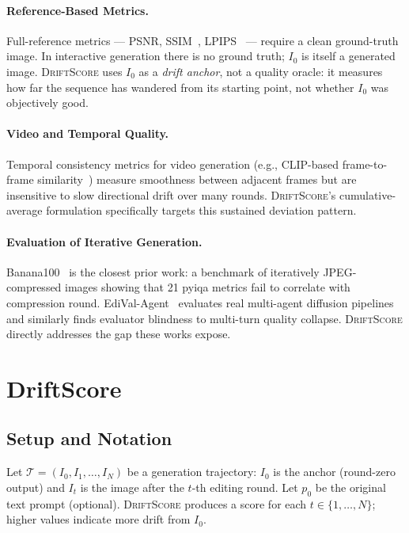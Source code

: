 \documentclass[sigconf]{acmart}
\newcommand{\DS}{\textsc{DriftScore}}
\newcommand{\Izero}{\ensuremath{I_0}}
\newcommand{\pzero}{\ensuremath{p_0}}
\begin{document}
\paragraph{Reference-Based Metrics.}
Full-reference metrics --- PSNR, SSIM~\cite{wang2004ssim},
LPIPS~\cite{zhang2018lpips} --- require a clean ground-truth image.
In interactive generation there is no ground truth; $\Izero$ is itself
a generated image.
\DS{} uses $\Izero$ as a \emph{drift anchor}, not a quality oracle: it
measures how far the sequence has wandered from its starting point, not
whether $\Izero$ was objectively good.

\paragraph{Video and Temporal Quality.}
Temporal consistency metrics for video generation
(e.g., CLIP-based frame-to-frame similarity~\cite{wu2023tuneavideo})
measure smoothness between adjacent frames but are insensitive to slow
directional drift over many rounds.
\DS{}'s cumulative-average formulation specifically targets this
sustained deviation pattern.

\paragraph{Evaluation of Iterative Generation.}
Banana100~\cite{banana100_2026} is the closest prior work: a benchmark
of iteratively JPEG-compressed images showing that 21 pyiqa metrics
fail to correlate with compression round.
EdiVal-Agent~\cite{edival2026} evaluates real multi-agent diffusion
pipelines and similarly finds evaluator blindness to multi-turn quality
collapse.
\DS{} directly addresses the gap these works expose.

\section{DriftScore}
\label{sec:method}

\subsection{Setup and Notation}
Let $\mathcal{T} = (\Izero, I_1, \ldots, I_N)$ be a generation
trajectory: $\Izero$ is the anchor (round-zero output) and $I_t$ is the
image after the $t$-th editing round.
Let $\pzero$ be the original text prompt (optional).
\DS{} produces a score for each $t \in \{1, \ldots, N\}$; higher values
indicate more drift from $\Izero$.
\end{document}
